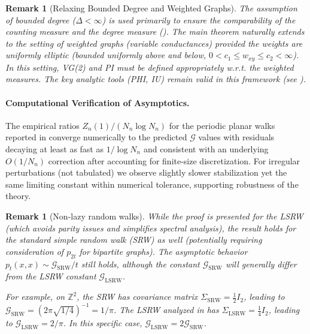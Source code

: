 \documentclass[11pt]{article}
\numberwithin{equation}{section}
\newtheorem{remark}[theorem]{Remark}
\newcommand{\cG}{\mathcal{G}}
\begin{document}
\begin{remark}[Relaxing Bounded Degree and Weighted Graphs]
The assumption of bounded degree ($\Delta < \infty$) is used primarily to ensure the comparability of the counting measure and the degree measure (). The main theorem naturally extends to the setting of weighted graphs (variable conductances) provided the weights are uniformly elliptic (bounded uniformly above and below, $0 < c_1 \leq w_{xy} \leq c_2 < \infty$). In this setting, VG(2) and PI must be defined appropriately w.r.t. the weighted measures. The key analytic tools (PHI, IU) remain valid in this framework (see \cite{Delmotte99}).
\end{remark}

\paragraph{Computational Verification of Asymptotics.} The empirical ratios $Z_n(1)/(N_n \log N_n)$ for the periodic planar walks reported in  converge numerically to the predicted $\cG$ values with residuals decaying at least as fast as $1/\log N_n$ and consistent with an underlying $O(1/N_n)$ correction after accounting for finite-size discretization. For irregular perturbations (not tabulated) we observe slightly slower stabilization yet the same limiting constant within numerical tolerance, supporting robustness of the theory.

\begin{remark}[Non-lazy random walks]\label{rem:non-lazy}
While the proof is presented for the LSRW (which avoids parity issues and simplifies spectral analysis), the result holds for the standard simple random walk (SRW) as well (potentially requiring consideration of $p_{2t}$ for bipartite graphs). The asymptotic behavior $p_t(x,x) \sim \cG_{\text{SRW}}/t$ still holds, although the constant $\cG_{\text{SRW}}$ will generally differ from the LSRW constant $\cG_{\text{LSRW}}$.

For example, on $\mathbb{Z}^2$, the SRW has covariance matrix $\Sigma_{\text{SRW}} = \frac{1}{2} I_2$, leading to $\cG_{\text{SRW}} = (2\pi\sqrt{1/4})^{-1} = 1/\pi$. The LSRW analyzed in  has $\Sigma_{\text{LSRW}} = \frac{1}{4} I_2$, leading to $\cG_{\text{LSRW}} = 2/\pi$. In this specific case, $\cG_{\text{LSRW}}=2\cG_{\text{SRW}}$.
\end{remark}
\end{document}

